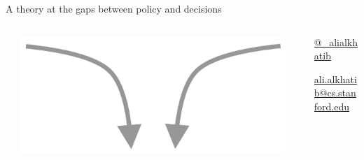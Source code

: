 \documentclass[presentation]{subfiles}
\begin{document}
\begin{frame}

{

{\large A theory at the gaps between policy and decisions}}

\begin{columns}[t]

  \begin{column}{0.15\textwidth}
    \begin{flushright}
    \end{flushright}
  \end{column}

  \begin{column}{0.20\textwidth}

  \vspace{2em}
  
  \includegraphics[width=\textwidth]{figures/sketches/arrows.pdf}

  \begin{center}
  \end{center}
  \end{column}
  
  \begin{column}{0.15\textwidth}
  \begin{flushleft}

  \end{flushleft}
  \end{column}

\begin{column}{0.5\textwidth}

\hfill {}

\hfill\href{http://twitter.com/_alialkhatib}{@\_alialkhatib}

\hfill\href{mailto:ali.alkhatib@cs.stanford.edu}{ali.alkhatib@cs.stanford.edu}

\end{column}

  \end{columns}


\end{frame}
\end{document}
